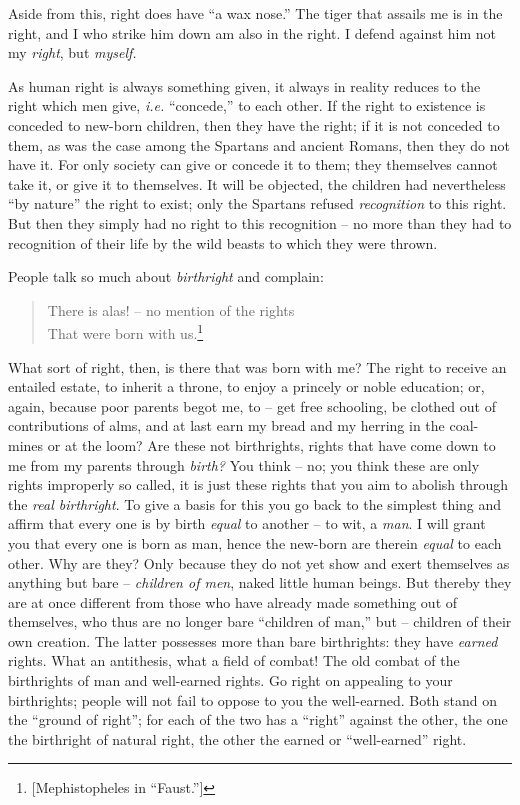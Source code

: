 \documentclass[12pt,a4paper]{book}
\begin{document}
Aside from this, right does have ``a wax nose.'' The tiger that assails me 
is in the right, and I who strike him down am also in the right. I defend 
against him not my \textit{right}, but \textit{myself.}

As human right is always something given, it always in reality reduces to the 
right which men give, \textit{i.e.} ``concede,'' to each other. If the right 
to existence is conceded to new-born children, then they have the right; if it 
is not conceded to them, as was the case among the Spartans and ancient 
Romans, then they do not have it. For only society can give or concede it to 
them; they themselves cannot take it, or give it to themselves. It will be 
objected, the children had nevertheless ``by nature'' the right to exist; 
only the Spartans refused \textit{recognition} to this right. But then they 
simply had no right to this recognition -- no more than they had to 
recognition of their life by the wild beasts to which they were thrown.

People talk so much about \textit{birthright} and complain:

\begin{quotation}

\noindent{} There is alas! -- no mention of the rights\\
 That were born with us.\footnote{[Mephistopheles in ``Faust.'']} 
\end{quotation}

\noindent{}What sort of right, then, is there that was born with me? The right 
to receive an entailed estate, to inherit a throne, to enjoy a princely or 
noble education; or, again, because poor parents begot me, to -- get free 
schooling, be clothed out of contributions of alms, and at last earn my bread 
and my herring in the coal-mines or at the loom? Are these not birthrights, 
rights that have come down to me from my parents through \textit{birth?} You 
think -- no; you think these are only rights improperly so called, it is just 
these rights that you aim to abolish through the \textit{real birthright}. To 
give a basis for this you go back to the simplest thing and affirm that every 
one is by birth \textit{equal} to another -- to wit, a \textit{man}. I will 
grant you that every one is born as man, hence the new-born are therein 
\textit{equal} to each other. Why are they? Only because they do not yet show 
and exert themselves as anything but bare -- \textit{children of men}, naked 
little human beings. But thereby they are at once different from those who 
have already made something out of themselves, who thus are no longer bare 
``children of man,'' but -- children of their own creation. The latter 
possesses more than bare birthrights: they have \textit{earned} rights. What 
an antithesis, what a field of combat! The old combat of the birthrights of 
man and well-earned rights. Go right on appealing to your birthrights; people 
will not fail to oppose to you the well-earned. Both stand on the ``ground of 
right''; for each of the two has a ``right'' against the other, the one the 
birthright of natural right, the other the earned or ``well-earned'' right.
\end{document}
